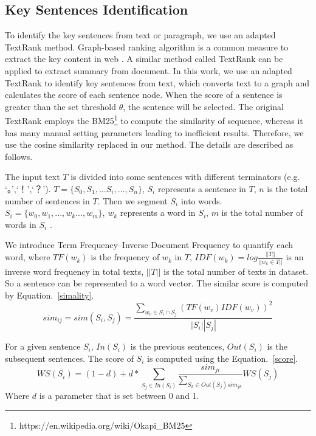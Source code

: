 \documentclass[runningheads,UTF8,article]{comsis2}
\begin{document}
	
	
	
	
	\subsection{Key Sentences Identification}
	
	To identify the key sentences from text or paragraph, we use an adapted TextRank method. Graph-based ranking algorithm is a common measure to extract the key content in web \cite{zhu2016deep,mihalcea2004graph}. A similar method called TextRank \cite{textrank} can be applied to extract summary from document. In this work, we use an adapted TextRank to identify key sentences from text, which converts text to a graph and calculates the score of each sentence node. When the score of a sentence is greater than the set threshold $ \theta $, the sentence will be selected. 
	The original TextRank employs the BM25\footnote{https://en.wikipedia.org/wiki/Okapi\_BM25} to compute the similarity of sequence, whereas it has many manual setting parameters leading to inefficient results. 
	Therefore, we use the cosine similarity replaced in our method. The details are described as follows.
	
	The input text $ T $ is divided into some sentences with different terminators (e.g. `。',`！',`？'). $ T=\{S_0,S_1,...S_i,...,S_n\}$, $ S_i  $ represents a sentence in $ T $, $ n $ is the total number of sentences in $ T $. Then we segment $ S_i $ into words. $ S_i=\{w_0,w_1,...,w_k...,w_m\}$, $ w_k $ represents a word in $ S_i  $, $ m  $ is the total number of words in $ S_i  $ . 
	
	We introduce Term Frequency–Inverse Document Frequency \cite{tfidf} to quantify each word, where $ TF(w_k) $ is the frequency of $ w_k $ in $ T $, $ IDF(w_k) =log \frac{||T||}{||w_k \in T||}$ is an inverse word frequency in total texts, $||T||$ is the total number of texts in dataset. So a sentence can be represented to a word vector. The similar score is computed by Equation.~\ref{simality}.
	\begin{equation}
		sim_{ij} = sim(S_i,S_j)=\frac{\sum_{w_v \in S_i \cap{S_j}}(TF(w_v)IDF(w_v))^2}{|S_i||S_j|}
		\label{simality}
	\end{equation}
	
	For a given sentence $ S_i $, $In(S_i) $ is the previous sentences, $ Out(S_i) $ is the subsequent sentences. The score of $ S_i $ is computed using the Equation.~\ref{score}.
	\begin{equation}
		WS(S_i)=(1-d)+d*\sum_{S_j \in In(S_i)} \frac{sim_{ji}}{ \sum_{S_k \in Out(S_j) sim_{jk}}}WS(S_j)
		\label{score}
	\end{equation}
	\noindent Where $ d $ is a parameter that is set between 0 and 1. 
	
\end{document}
